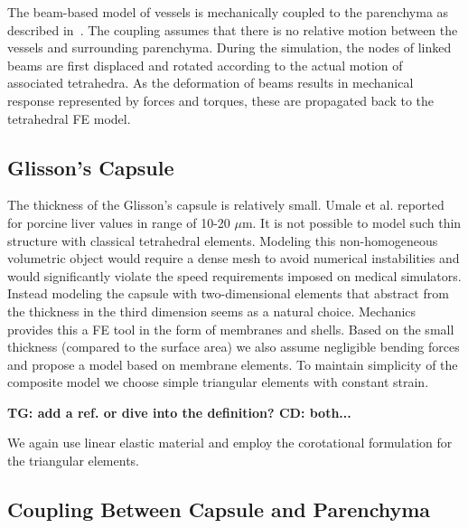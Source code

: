 \documentclass{llncs}
\newcommand{\TG}[1]{{\color{blue}\textbf{TG: #1}}}
\newcommand{\CD}[1]{{\color{green}\textbf{CD: #1}}}
\begin{document}
The beam-based model of vessels is mechanically coupled to the parenchyma as described in~\cite{Peterlik2012}. 
The coupling assumes that there is no relative motion between the vessels and surrounding parenchyma. 
During the simulation, the nodes of linked beams are first displaced and rotated according to the actual motion of associated tetrahedra. 
As the deformation of beams results in mechanical response represented by forces and torques, these are propagated back to 
the tetrahedral FE model. 



\subsection{Glisson's Capsule} %

The thickness of the Glisson's capsule is relatively small. Umale et al.
\cite{Umale2011} reported for porcine liver values in range of 10-20
$\mu$m.
It is not possible to model such thin structure with classical tetrahedral
elements. Modeling this non-homogeneous volumetric object would require a
dense mesh to avoid numerical instabilities and would significantly
violate the speed requirements imposed on medical simulators.
Instead modeling the capsule with two-dimensional elements that abstract from the
thickness in the third dimension seems
as a natural choice. Mechanics provides this a FE tool in the form of membranes
and shells. Based on the small thickness (compared to the surface area) we also
assume negligible bending forces and propose a model based on membrane
elements. 
To maintain simplicity of the composite model we choose simple triangular
elements with constant strain.

\TG{add a ref. or dive into the definition? \cite{Felippa2003}} \CD{both...}

We again use linear elastic material and employ the corotational formulation
for the triangular elements.


\subsection{Coupling Between Capsule and Parenchyma} %
\end{document}
